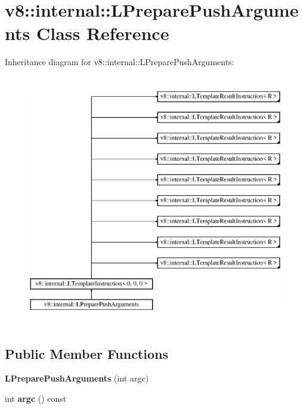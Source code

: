 \hypertarget{classv8_1_1internal_1_1_l_prepare_push_arguments}{}\section{v8\+:\+:internal\+:\+:L\+Prepare\+Push\+Arguments Class Reference}
\label{classv8_1_1internal_1_1_l_prepare_push_arguments}
Inheritance diagram for v8\+:\+:internal\+:\+:L\+Prepare\+Push\+Arguments\+:\begin{figure}[H]
\begin{center}
\leavevmode
\includegraphics[height=11.000000cm]{classv8_1_1internal_1_1_l_prepare_push_arguments}
\end{center}
\end{figure}
\subsection*{Public Member Functions}
\begin{DoxyCompactItemize}
\item 
{\bfseries L\+Prepare\+Push\+Arguments} (int argc)\hypertarget{classv8_1_1internal_1_1_l_prepare_push_arguments_ade3e965ff5a0ef143b8ad3dc2a092a3d}{}\label{classv8_1_1internal_1_1_l_prepare_push_arguments_ade3e965ff5a0ef143b8ad3dc2a092a3d}

\item 
int {\bfseries argc} () const \hypertarget{classv8_1_1internal_1_1_l_prepare_push_arguments_a011d845c72694f07fca2bdb29f4d745d}{}\label{classv8_1_1internal_1_1_l_prepare_push_arguments_a011d845c72694f07fca2bdb29f4d745d}

\end{DoxyCompactItemize}

